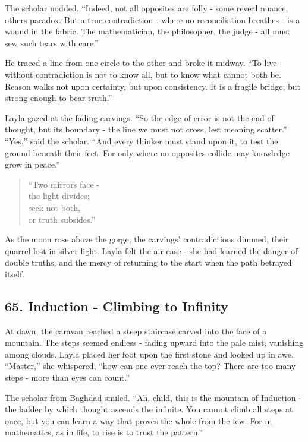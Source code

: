 \documentclass[
  letterpaper,
  DIV=11,
  numbers=noendperiod]{scrreprt}
\begin{document}
The scholar nodded. ``Indeed, not all opposites are folly - some reveal
nuance, others paradox. But a true contradiction - where no
reconciliation breathes - is a wound in the fabric. The mathematician,
the philosopher, the judge - all must sew such tears with care.''

He traced a line from one circle to the other and broke it midway. ``To
live without contradiction is not to know all, but to know what cannot
both be. Reason walks not upon certainty, but upon consistency. It is a
fragile bridge, but strong enough to bear truth.''

Layla gazed at the fading carvings. ``So the edge of error is not the
end of thought, but its boundary - the line we must not cross, lest
meaning scatter.'' ``Yes,'' said the scholar. ``And every thinker must
stand upon it, to test the ground beneath their feet. For only where no
opposites collide may knowledge grow in peace.''

\begin{quote}
``Two mirrors face -\\
the light divides;\\
seek not both,\\
or truth subsides.''
\end{quote}

As the moon rose above the gorge, the carvings' contradictions dimmed,
their quarrel lost in silver light. Layla felt the air ease - she had
learned the danger of double truths, and the mercy of returning to the
start when the path betrayed itself.

\subsection{65. Induction - Climbing to
Infinity}\label{induction---climbing-to-infinity}

At dawn, the caravan reached a steep staircase carved into the face of a
mountain. The steps seemed endless - fading upward into the pale mist,
vanishing among clouds. Layla placed her foot upon the first stone and
looked up in awe. ``Master,'' she whispered, ``how can one ever reach
the top? There are too many steps - more than eyes can count.''

The scholar from Baghdad smiled. ``Ah, child, this is the mountain of
Induction - the ladder by which thought ascends the infinite. You cannot
climb all steps at once, but you can learn a way that proves the whole
from the few. For in mathematics, as in life, to rise is to trust the
pattern.''
\end{document}
